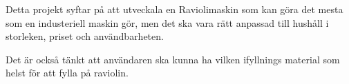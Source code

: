Detta projekt syftar på att utveckala en Raviolimaskin som kan göra det mesta som en industeriell maskin gör, men det ska vara rätt anpassad till hushåll i storleken, priset och användbarheten.

Det är också tänkt att användaren ska kunna ha vilken ifyllnings material som helst för att fylla på raviolin.



